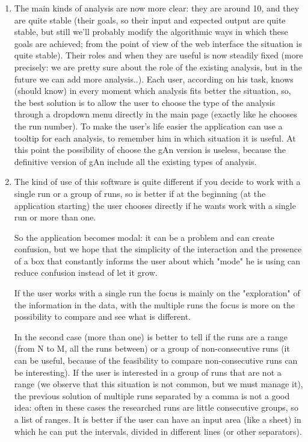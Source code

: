 \begin{enumerate}
\item 
The main kinds of analysis are now more clear: they are around 10, and they are     quite stable (their goals, so their input and expected output are quite stable, but still we'll probably modify the algorithmic ways in which these goals are achieved; from the point of view of the web interface the situation is quite stable). Their roles and when they are useful is now steadily fixed (more precisely: we are pretty sure about the role of the existing analysis, but in the future we can add more analysis..). Each user, according on his task, knows (should know) in every moment which analysis fits better the situation, so, the best solution is to allow the user to choose the type of the analysis through a dropdown menu directly in the main page (exactly like he chooses the run number). To make the user's life easier the application can use a tooltip for each analysis, to remember him in which situation it is useful. At this point the possibility of choose the gAn version is useless, because the definitive version of gAn include all the existing types of analysis. 

\item 
The kind of use of this software is quite different if you decide to work with a single run or a group of runs, so is better if at the beginning (at the application starting) the user chooses directly if he wants work with a single run or more than one. 

So the application becomes modal: it can be a problem and can create confusion, but we hope that the simplicity of the interaction and the presence of a box that constantly informs the user about which "mode" he is using can reduce confusion instead of let it grow.  

If the user works with a single run the focus is mainly on the "exploration" of the information in the data, with the multiple runs the focus is more on the possibility to compare and see what is different.

In the second case (more than one) is better to tell if the runs are a range (from N to M, all the runs between) or a group of non-consecutive runs (it can be useful, because of the feasibility to compare non-consecutive runs can be interesting). If the user is interested in a group of runs that are not a range (we observe that this situation is not common, but we must manage it), the previous solution of multiple runs separated by a comma is not a good idea: often in these cases the researched runs are little consecutive groups, so a list of ranges. It is better if the user can have an input area (like a sheet) in which he can put the intervals, divided in different lines (or other separators).


\end{enumerate}
